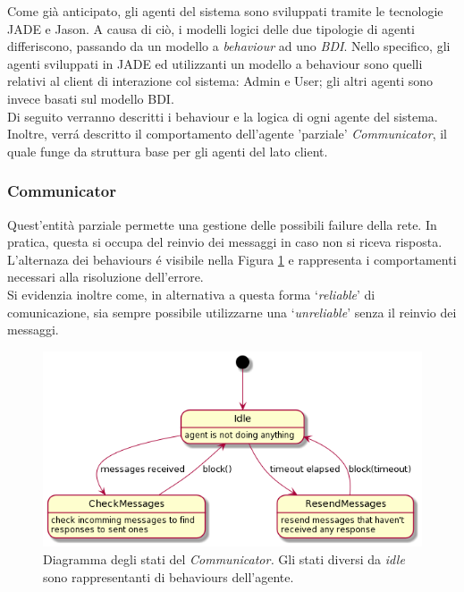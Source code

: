 
Come già anticipato, gli agenti del sistema sono sviluppati tramite le tecnologie JADE e Jason. A causa di ciò, i modelli logici delle due tipologie di agenti differiscono, passando da un modello a \textit{behaviour} ad uno \textit{BDI}. Nello specifico, gli agenti sviluppati in JADE ed utilizzanti un modello a behaviour sono quelli relativi al client di interazione col sistema: Admin e User; gli altri agenti sono invece basati sul modello BDI.\\
Di seguito verranno descritti i behaviour e la logica di ogni agente del sistema. Inoltre, verr\'a descritto il comportamento dell'agente 'parziale' \textit{Communicator}, il quale funge da struttura base per gli agenti del lato client.

\subsubsection{Communicator}
Quest'entità parziale permette una gestione delle possibili failure della rete. In pratica, questa si occupa del reinvio dei messaggi in caso non si riceva risposta.\\
L'alternaza dei behaviours \'e visibile nella Figura \ref{fig:communicator_state_diagrams} e rappresenta i comportamenti necessari alla risoluzione dell'errore.\\
Si evidenzia inoltre come, in alternativa a questa forma `\textit{reliable}' di comunicazione, sia sempre possibile utilizzarne una `\textit{unreliable}' senza il reinvio dei messaggi.
\begin{figure}[ht]
    \includegraphics[width=\textwidth]{section/design/figure/agent/communicator_states.png}
    \caption{Diagramma degli stati del \textit{Communicator.} Gli stati diversi da \textit{idle} sono rappresentanti di behaviours dell'agente.}
    \label{fig:communicator_state_diagrams}
\end{figure}

